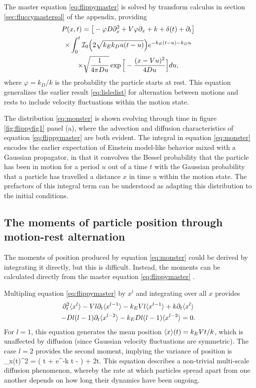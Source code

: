 The master equation \ref{eq:flippymaster} is solved by transform calculus in section \ref{sec:fluccymastersol} of the appendix, providing
\begin{multline} P(x,t) = \big[-\varphi D\partial_x^2 + V\varphi \partial_x + k + \delta(t) +  \partial_t \big]\\
	\times \int_0^t \mathcal{I}_0\Big( 2 \sqrt{k_Ek_D u(t-u)}\Big) e^{-k_E(t-u)-k_D u} \\ \times \sqrt{ \frac{1}{4\pi D u}} \exp\Big[- \frac{(x-Vu)^2}{4Du}\Big] du, \label{eq:monster}
 \end{multline}
where $\varphi=k_D/k$ is the probability the particle starts at rest. This equation generalizes the earlier result  \ref{eq:lisledist} for alternation between motions and rests to include velocity fluctuations within the motion state.

The distribution \ref{eq:monster} is shown evolving through time in figure \ref{fig:flippyfig1} panel (a), where the advection and diffusion characteristics of equation \ref{eq:flippymaster} are both evident. The integral in equation \ref{eq:monster} encodes the earlier expectation of Einstein model-like behavior mixed with a Gaussian propagator, in that it convolves the Bessel probability that the particle has been in motion for a period $u$ out of a time $t$ with the Gaussian probability that a particle has travelled a distance $x$ in time $u$ within the motion state. The prefactors of this integral term can be understood as adapting this distribution to the initial conditions.

\subsection{The moments of particle position through motion-rest alternation}
The moments of position produced by equation \ref{eq:monster} could be derived by integrating it directly, but this is difficult. Instead, the moments can be calculated directly from the master equation \ref{eq:flippymaster} \citep{Cox1965}. 

Multipling equation \ref{eq:flippymaster} by $x^l$ and integrating over all $x$ provides
\begin{multline} \partial_t^2 \langle x^l \rangle -V l \partial_t \langle x^{l-1} \rangle -k_E V l \langle x^{l-1} \rangle + k \partial_t \langle x^{l} \rangle\\- D l (l-1) \partial_t \langle x^{l-2} \rangle - k_E D l(l-1) \langle x^{l-2} \rangle = 0.\end{multline}
For $l = 1$, this equation generates the mean position $ \langle x \rangle(t) = k_E V t/k$, which is unaffected by diffusion (since Gaussian velocity fluctuations are symmetric).
The case $l=2$ provides the second moment, implying the variance of position is
\be \sigma_x(t)^2 = \Big( t + e^{-k t} - \Big) + 2t. \label{eq:minor} \ee
This equation describes a non-trivial multi-scale diffusion phenomenon, whereby the rate at which particles spread apart from one another depends on how long their dynamics have been ongoing.

